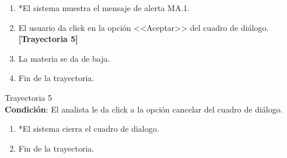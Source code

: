 \begin{enumerate}
    \item *El sistema muestra el mensaje de alerta MA.1.
    \item El usuario da click en la opción <<Aceptar>> del cuadro de diálogo. \textbf{[Trayectoria 5]}
    \item La materia se da de baja.
    \item Fin de la trayectoria.
\end{enumerate}
\large{Trayectoria 5}\\
\textbf{Condición}: El analista le da click a la opción cancelar del cuadro de  diálogo.
\begin{enumerate}
    \item *El sistema cierra el cuadro de dialogo.
    \item Fin de la trayectoria.
\end{enumerate}
